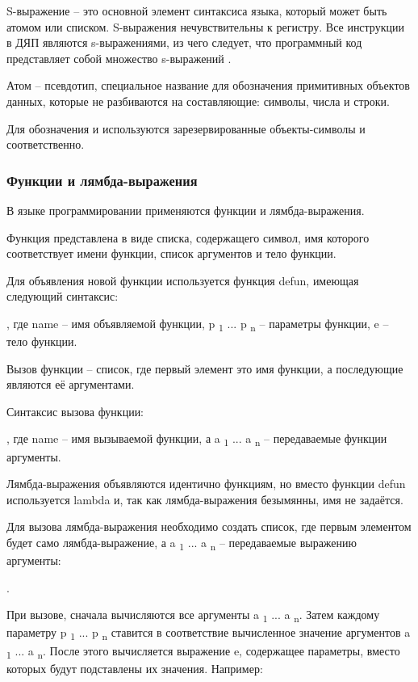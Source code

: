 S-выражение -- это основной элемент синтаксиса языка, который может быть атомом или списком. S-выражения нечувствительны к регистру. Все инструкции в ДЯП являются s-выражениями, из чего следует, что программный код представляет собой множество s-выражений \cite{e10}.

Атом -- псевдотип, специальное название для обозначения примитивных объектов данных, которые не разбиваются на составляющие: символы, числа и строки.

Для обозначения  и  используются зарезервированные объекты-символы  и  соответственно.

\subsubsection{Функции и лямбда-выражения}

В языке программировании применяются функции и лямбда-выражения.

Функция представлена в виде списка, содержащего символ, имя которого соответствует имени функции, список аргументов и тело функции.

Для объявления новой функции используется функция defun, имеющая следующий синтаксис:

, где name -- имя объявляемой функции, p \textsubscript 1 ... p \textsubscript n -- параметры функции, e -- тело функции.

Вызов функции -- список, где первый элемент это имя функции, а последующие являются её аргументами.

Синтаксис вызова функции:

, где name -- имя вызываемой функции, а a \textsubscript 1 ... a \textsubscript n -- передаваемые функции аргументы.

Лямбда-выражения объявляются идентично функциям, но вместо функции defun используется lambda и, так как лямбда-выражения безымянны, имя не задаётся.

Для вызова лямбда-выражения необходимо создать список, где первым элементом будет само лямбда-выражение, а a \textsubscript 1 ... a \textsubscript n -- передаваемые выражению аргументы: 

.

При вызове, сначала вычисляются все аргументы a \textsubscript 1 ... a \textsubscript n. Затем каждому параметру p \textsubscript 1 ... p \textsubscript n ставится в соответствие вычисленное значение аргументов a \textsubscript 1 ... a \textsubscript n. После этого вычисляется выражение e, содержащее параметры, вместо которых будут подставлены их значения. Например:

